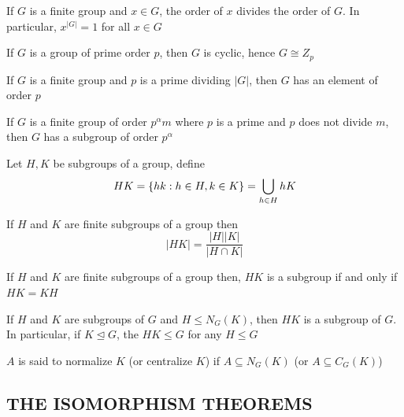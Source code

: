 \begin{corollary}
	If $G$ is a finite group and $x \in G$, the order of $x$ divides the order of $G$. In particular, $x^{|G|} = 1$ for all $x \in G$
\end{corollary}

\begin{corollary}
	If $G$ is a group of prime order $p$, then $G$ is cyclic, hence $G \cong Z_p$
\end{corollary}

\begin{theorem}
	If $G$ is a finite group and $p$ is a prime dividing $|G|$, then $G$ has an element of order $p$
\end{theorem}

\begin{theorem}
	If $G$ is a finite group of order $p^\alpha m$ where $p$ is a prime and $p$ does not divide $m$, then $G$ has a subgroup of order $p^\alpha$
\end{theorem}

\begin{definition}
	Let $H, K$ be subgroups of a group, define
	\[
	HK = \{hk: h \in H, k \in K\} = \bigcup_{h \in H} hK
	\]
\end{definition}

\begin{proposition}
	If $H$ and $K$ are finite subgroups of a group then
	\[
	|HK| = \frac{|H||K|}{|H \cap K|}
	\]
\end{proposition}

\begin{proposition}
	If $H$ and $K$ are finite subgroups of a group then, $HK$ is a subgroup if and only if $HK = KH$
\end{proposition}

\begin{corollary}
	If $H$ and $K$ are subgroups of $G$ and $H \leq N_G(K)$, then $HK$ is a subgroup of $G$. In particular, if $K \trianglelefteq G$, the $HK \leq G$ for any $H \leq G$
\end{corollary}

\begin{definition}
	$A$ is said to normalize $K$ (or centralize $K$) if $A \subseteq N_G(K)$ (or $A \subseteq C_G(K)$)
\end{definition}

\subsection{THE ISOMORPHISM THEOREMS}

